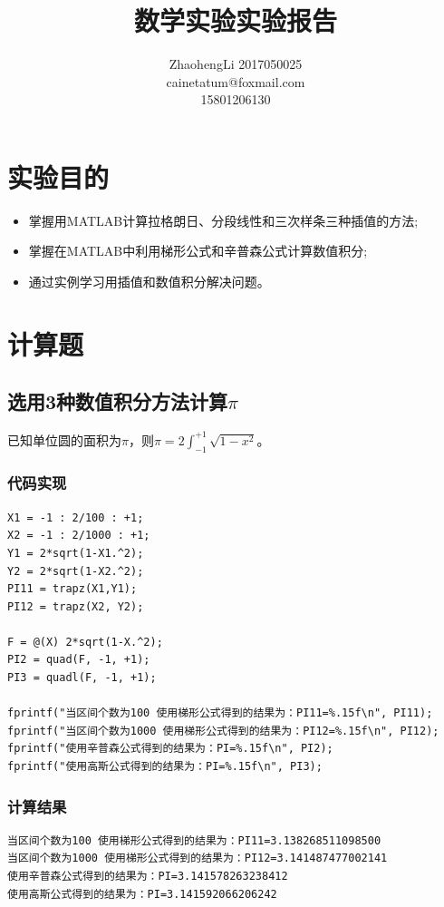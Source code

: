 \documentclass{article}
\title{数学实验实验报告}
\author{ZhaohengLi 2017050025\\cainetatum@foxmail.com\\15801206130}
\begin{document}
\maketitle{}

\section{实验目的}
\begin{itemize}
	\item{掌握用MATLAB计算拉格朗日、分段线性和三次样条三种插值的方法;}
	\item{掌握在MATLAB中利用梯形公式和辛普森公式计算数值积分;}
	\item{通过实例学习用插值和数值积分解决问题。}
\end{itemize}

\section{计算题}

\subsection{选用3种数值积分方法计算$\pi$}
已知单位圆的面积为$\pi$，则$\pi=2\int_{-1}^{+1}\sqrt{1-x^{2}}$。
\subsubsection{代码实现}
\begin{lstlisting}
X1 = -1 : 2/100 : +1;
X2 = -1 : 2/1000 : +1;
Y1 = 2*sqrt(1-X1.^2);
Y2 = 2*sqrt(1-X2.^2);
PI11 = trapz(X1,Y1);
PI12 = trapz(X2, Y2);

F = @(X) 2*sqrt(1-X.^2);
PI2 = quad(F, -1, +1);
PI3 = quadl(F, -1, +1);

fprintf("当区间个数为100 使用梯形公式得到的结果为：PI11=%.15f\n", PI11);
fprintf("当区间个数为1000 使用梯形公式得到的结果为：PI12=%.15f\n", PI12);
fprintf("使用辛普森公式得到的结果为：PI=%.15f\n", PI2);
fprintf("使用高斯公式得到的结果为：PI=%.15f\n", PI3);
\end{lstlisting}

\subsubsection{计算结果}
\begin{lstlisting}
当区间个数为100 使用梯形公式得到的结果为：PI11=3.138268511098500
当区间个数为1000 使用梯形公式得到的结果为：PI12=3.141487477002141
使用辛普森公式得到的结果为：PI=3.141578263238412
使用高斯公式得到的结果为：PI=3.141592066206242
\end{lstlisting}
\end{document}
